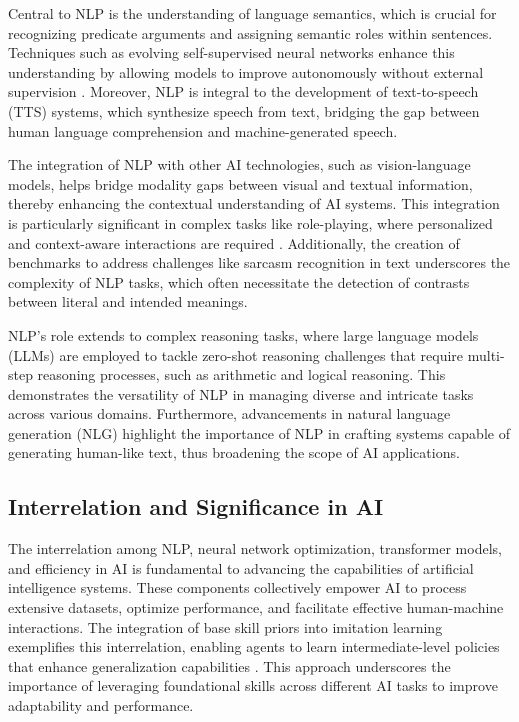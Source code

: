 Central to NLP is the understanding of language semantics, which is crucial for recognizing predicate arguments and assigning semantic roles within sentences. Techniques such as evolving self-supervised neural networks enhance this understanding by allowing models to improve autonomously without external supervision \cite{le2019evolvingselfsupervisedneuralnetworks}. Moreover, NLP is integral to the development of text-to-speech (TTS) systems, which synthesize speech from text, bridging the gap between human language comprehension and machine-generated speech.



The integration of NLP with other AI technologies, such as vision-language models, helps bridge modality gaps between visual and textual information, thereby enhancing the contextual understanding of AI systems. This integration is particularly significant in complex tasks like role-playing, where personalized and context-aware interactions are required \cite{wang2023environmenttransformerpolicyoptimization}. Additionally, the creation of benchmarks to address challenges like sarcasm recognition in text underscores the complexity of NLP tasks, which often necessitate the detection of contrasts between literal and intended meanings.



NLP's role extends to complex reasoning tasks, where large language models (LLMs) are employed to tackle zero-shot reasoning challenges that require multi-step reasoning processes, such as arithmetic and logical reasoning. This demonstrates the versatility of NLP in managing diverse and intricate tasks across various domains. Furthermore, advancements in natural language generation (NLG) highlight the importance of NLP in crafting systems capable of generating human-like text, thus broadening the scope of AI applications.







\subsection{Interrelation and Significance in AI} \label{subsec:Interrelation and Significance in AI}

The interrelation among NLP, neural network optimization, transformer models, and efficiency in AI is fundamental to advancing the capabilities of artificial intelligence systems. These components collectively empower AI to process extensive datasets, optimize performance, and facilitate effective human-machine interactions. The integration of base skill priors into imitation learning exemplifies this interrelation, enabling agents to learn intermediate-level policies that enhance generalization capabilities \cite{zhou2024languageconditionedimitationlearningbase}. This approach underscores the importance of leveraging foundational skills across different AI tasks to improve adaptability and performance.



